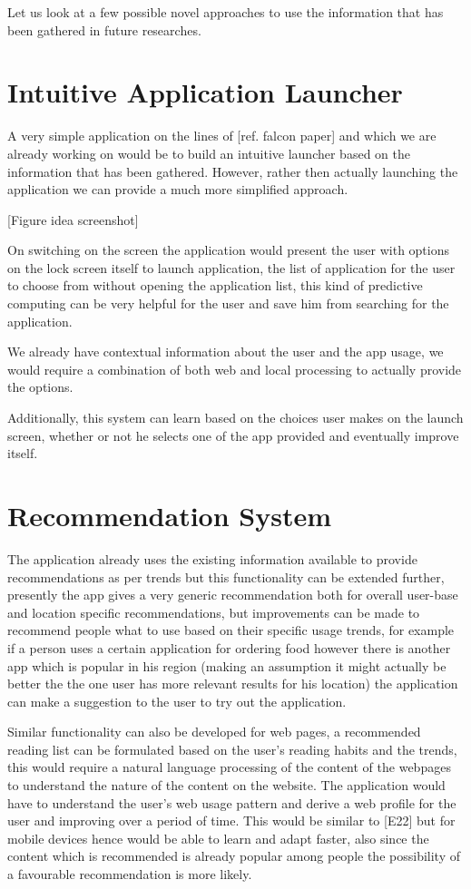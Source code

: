 \documentclass[12pt]{report}
\begin{document}
Let us look at a few possible novel approaches to use the information that has been gathered in future researches.


\section{Intuitive Application Launcher}

A very simple application on the lines of [ref. falcon paper] and which we are already working on would be to build an intuitive launcher based on the information that has been gathered. However, rather then actually launching the application we can provide a much more simplified approach.

[Figure idea screenshot]

On switching on the screen the application would present the user with options on the lock screen itself to launch application, the list of application for the user to choose from without opening the application list, this kind of predictive computing can be very helpful for the user and save him from searching for the application.

We already have contextual information about the user and the app usage, we would require a combination of both web and local processing to actually provide the options.

Additionally, this system can learn based on the choices user makes on the launch screen, whether or not he selects one of the app provided and eventually improve itself.

\section{Recommendation System}
\label{RecommendationSystem}
The application already uses the existing information available to provide recommendations as per trends but this functionality can be extended further, presently the app gives a very generic recommendation both for overall user-base and location specific recommendations, but improvements can be made to recommend people what to use based on their specific usage trends, for example if a person uses a certain application for ordering food however there is another app which is popular in his region (making an assumption it might actually be better the the one user has more relevant results for his location) the application can make a suggestion to the user to try out the application.

Similar functionality can also be developed for web pages, a recommended reading list can be formulated based on the user's reading habits and the trends, this would require a natural language processing of the content of the webpages to understand the nature of the content on the website. The application would have to understand the user's web usage pattern and derive a web profile for the user and improving over a period of time. This would be similar to [E22] but for mobile devices hence would be able to learn and adapt faster, also since the content which is recommended is already popular among people the possibility of a favourable recommendation is more likely.
\end{document}

